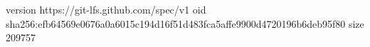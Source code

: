 version https://git-lfs.github.com/spec/v1
oid sha256:efb64569e0676a0a6015c194d16f51d483fca5affe9900d4720196b6deb95f80
size 209757
